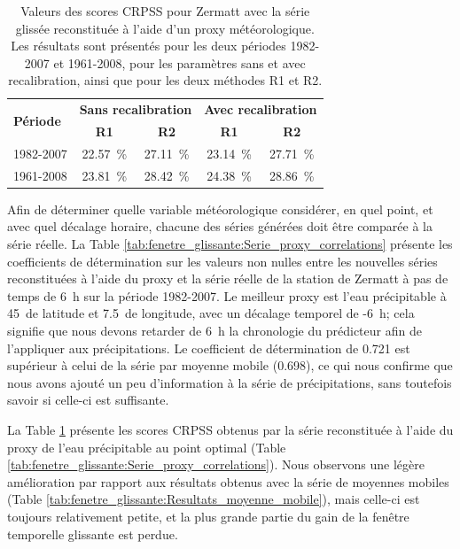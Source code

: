 \documentclass[hess]{copernicus}
\begin{document}
\begin{table}[htb]
	\caption{Valeurs des scores CRPSS pour Zermatt avec la série glissée reconstituée à l'aide d'un proxy météorologique. Les résultats sont présentés pour les deux périodes 1982-2007 et 1961-2008, pour les paramètres sans et avec recalibration, ainsi que pour les deux méthodes R1 et R2.}
	\begin{center}
		\begin{tabular*}{10cm}{@{\extracolsep{\fill}}lcccc}
			\hline
			\multirow{2}{*}{\textbf{Période}} & \multicolumn{ 2}{c}{\textbf{Sans recalibration}} & \multicolumn{ 2}{c}{\textbf{Avec recalibration}} \\
			& \multicolumn{1}{c}{\textbf{R1}} & \textbf{R2} & \multicolumn{1}{c}{\textbf{R1}} & \textbf{R2} \\ \hline
			1982-2007 & 22.57~\% & 27.11~\% & 23.14~\% & 27.71~\% \\ \hline
			1961-2008 & 23.81~\% & 28.42~\% & 24.38~\% & 28.86~\% \\ \hline
		\end{tabular*}
	\end{center}
	\label{tab:fenetre_glissante:Resultats_proxy_Zermatt}
\end{table}


Afin de déterminer quelle variable météorologique considérer, en quel point, et avec quel décalage horaire, chacune des séries générées doit être comparée à la série réelle. La Table \ref{tab:fenetre_glissante:Serie_proxy_correlations} présente les coefficients de détermination sur les valeurs non nulles entre les nouvelles séries reconstituées à l'aide du proxy et la série réelle de la station de Zermatt à pas de temps de 6~h sur la période 1982-2007. Le meilleur proxy est l'eau précipitable à 45\textdegree\ de latitude et 7.5\textdegree\ de longitude, avec un décalage temporel de -6~h; cela signifie que nous devons retarder de 6~h la chronologie du prédicteur afin de l'appliquer aux précipitations. Le coefficient de détermination de 0.721 est supérieur à celui de la série par moyenne mobile (0.698), ce qui nous confirme que nous avons ajouté un peu d'information à la série de précipitations, sans toutefois savoir si celle-ci est suffisante.

La Table \ref{tab:fenetre_glissante:Resultats_proxy_Zermatt} présente les scores CRPSS obtenus par la série reconstituée à l'aide du proxy de l'eau précipitable au point optimal (Table \ref{tab:fenetre_glissante:Serie_proxy_correlations}). Nous observons une légère amélioration par rapport aux résultats obtenus avec la série de moyennes mobiles (Table \ref{tab:fenetre_glissante:Resultats_moyenne_mobile}), mais celle-ci est toujours relativement petite, et la plus grande partie du gain de la fenêtre temporelle glissante est perdue.
\end{document}
